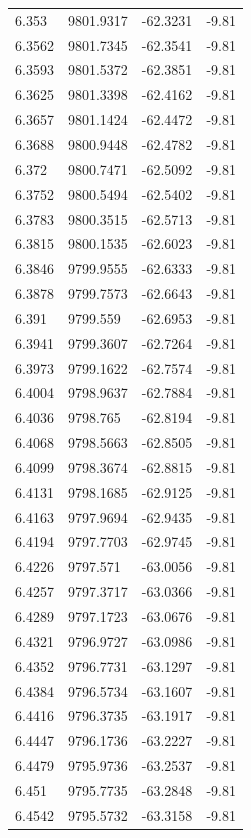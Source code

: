\begin{table}[H]
\begin{tabular}{llll}
6.353 & 9801.9317 & -62.3231 & -9.81 \\
6.3562 & 9801.7345 & -62.3541 & -9.81 \\
6.3593 & 9801.5372 & -62.3851 & -9.81 \\
6.3625 & 9801.3398 & -62.4162 & -9.81 \\
6.3657 & 9801.1424 & -62.4472 & -9.81 \\
6.3688 & 9800.9448 & -62.4782 & -9.81 \\
6.372 & 9800.7471 & -62.5092 & -9.81 \\
6.3752 & 9800.5494 & -62.5402 & -9.81 \\
6.3783 & 9800.3515 & -62.5713 & -9.81 \\
6.3815 & 9800.1535 & -62.6023 & -9.81 \\
6.3846 & 9799.9555 & -62.6333 & -9.81 \\
6.3878 & 9799.7573 & -62.6643 & -9.81 \\
6.391 & 9799.559 & -62.6953 & -9.81 \\
6.3941 & 9799.3607 & -62.7264 & -9.81 \\
6.3973 & 9799.1622 & -62.7574 & -9.81 \\
6.4004 & 9798.9637 & -62.7884 & -9.81 \\
6.4036 & 9798.765 & -62.8194 & -9.81 \\
6.4068 & 9798.5663 & -62.8505 & -9.81 \\
6.4099 & 9798.3674 & -62.8815 & -9.81 \\
6.4131 & 9798.1685 & -62.9125 & -9.81 \\
6.4163 & 9797.9694 & -62.9435 & -9.81 \\
6.4194 & 9797.7703 & -62.9745 & -9.81 \\
6.4226 & 9797.571 & -63.0056 & -9.81 \\
6.4257 & 9797.3717 & -63.0366 & -9.81 \\
6.4289 & 9797.1723 & -63.0676 & -9.81 \\
6.4321 & 9796.9727 & -63.0986 & -9.81 \\
6.4352 & 9796.7731 & -63.1297 & -9.81 \\
6.4384 & 9796.5734 & -63.1607 & -9.81 \\
6.4416 & 9796.3735 & -63.1917 & -9.81 \\
6.4447 & 9796.1736 & -63.2227 & -9.81 \\
6.4479 & 9795.9736 & -63.2537 & -9.81 \\
6.451 & 9795.7735 & -63.2848 & -9.81 \\
6.4542 & 9795.5732 & -63.3158 & -9.81 \\

\end{tabular}
\end{table}
